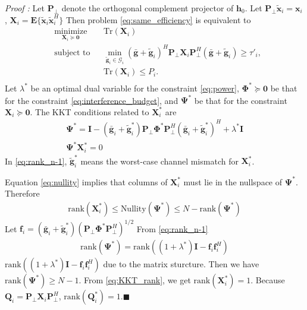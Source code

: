 \documentclass[journal]{IEEEtran}
\begin{document}
\emph{Proof :} Let $\mathbf{P}_{\perp}$ denote the orthogonal complement projector of $\mathbf{h}_0$. Let $\mathbf{P}_{\perp}\tilde{\mathbf{x}}_i = \mathbf{x}_i$, $\mathbf{X}_i = \mathbf{E}\{\tilde{\mathbf{x}}_i\tilde{\mathbf{x}}_i^H\}$ Then problem \eqref{eq:same_efficiency} is equivalent to 
\begin{align} 
& \underset{\mathbf{X}_i \succeq \mathbf{0}}{\text{minimize}}
& & \text{Tr}(\mathbf{X}_i)\\
& \text{subject to}
& & \min_{\tilde{\mathbf{g}}_i \in \mathcal{G}_i}(\bar{\mathbf{g}}+\tilde{\mathbf{g}}_i)^H\mathbf{P}_{\perp}\mathbf{X}_i\mathbf{P}_{\perp }^H(\bar{\mathbf{g}}+\tilde{\mathbf{g}}_i) \geq \tau'_i, \label{eq:interference_budget}\\
&&& \text{Tr}\left(\mathbf{X}_i\right) \leq P_i.\label{eq:power}\\ 
\end{align}
Let $\lambda^*$ be an optimal dual variable for the constraint \eqref{eq:power}, $\mathbf{\Phi}^* \succeq \mathbf{0}$
be that for the constraint \eqref{eq:interference_budget}, and $\mathbf{\Psi}^*$ be that for the constraint $\mathbf{X}_i \succeq \mathbf{0}$. The KKT conditions related to $\mathbf{X}_i^*$ are 
\begin{eqnarray}
	\mathbf{\Psi}^*=\mathbf{I} - (\bar{\mathbf{g}}_i + \tilde{\mathbf{g}}_i^*)\mathbf{P}_{\perp}\mathbf{\Phi}^*\mathbf{P}_{\perp}^H(\bar{\mathbf{g}}_i + \tilde{\mathbf{g}}_i^*)^H + \lambda^*\mathbf{I} \label{eq:rank_n-1}\\
	\mathbf{\Psi}^*\mathbf{X}_i^* = 0 \label{eq:nullity} 
\end{eqnarray}
In \eqref{eq:rank_n-1}, $\tilde{\mathbf{g}}_i^*$ means the worst-case channel mismatch for $\mathbf{X}_i^*$. 

Equation \eqref{eq:nullity} implies that columns of $\mathbf{X}_i^*$ must lie in the nullspace of $\mathbf{\Psi}^*$. Therefore
\begin{eqnarray} 
\text{rank}\left(\mathbf{X}_i^*\right) \leq \text{Nullity}\left(\mathbf{\Psi}^*\right) \leq N - \text{rank}\left(\mathbf{\Psi}^*\right) \label{eq:KKT_rank}
\end{eqnarray}
Let $\mathbf{f}_i = (\bar{\mathbf{g}}_i + \tilde{\mathbf{g}}_i^*)\left(\mathbf{P}_{\perp}\mathbf{\Phi}^*\mathbf{P}_{\perp}^H\right)^{1/2}$
From \eqref{eq:rank_n-1}
\begin{eqnarray}
\text{rank}\left(\mathbf{\Psi}^*\right) = \text{rank}\left((1 + \lambda^*)\mathbf{I} - \mathbf{f}_i\mathbf{f}_i^H\right)
\end{eqnarray}
$\text{rank}\left((1 + \lambda^*)\mathbf{I} - \mathbf{f}_i\mathbf{f}_i^H\right)$ due to the matrix sturcture. Then we have $\text{rank}\left(\mathbf{\Psi}^*\right) \geq N - 1$. From \eqref{eq:KKT_rank}, we get $\text{rank}\left(\mathbf{X}_i^*\right) = 1$. Because $\mathbf{Q}_i = \mathbf{P}_{\perp}\mathbf{X}_i\mathbf{P}_{\perp}^H$, $\text{rank}\left(\mathbf{Q}_i^*\right) = 1$.$\blacksquare$
\end{document}
